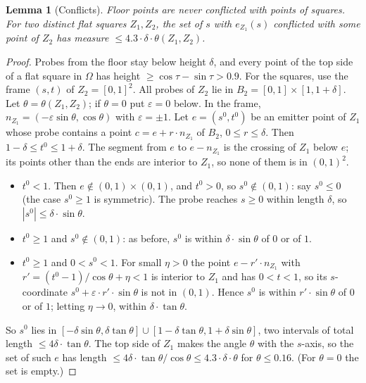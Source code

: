 \documentclass[11pt,letterpaper]{amsart}
\theoremstyle{plain}
\newtheorem{lemma}[theorem]{Lemma}
\theoremstyle{definition}
\theoremstyle{remark}
\begin{document}
\begin{lemma}[Conflicts]\label{lem:conflicts}
Floor points are never conflicted with points of squares. For two distinct flat squares $Z_1,Z_2$, the set of $s$ with $e_{Z_1}(s)$ conflicted with some point of $Z_2$ has measure $\le4.3\cdot\delta\cdot\theta(Z_1,Z_2)$.
\end{lemma}
\begin{proof}
Probes from the floor stay below height $\delta$, and every point of the top side of a flat square in $\Omega$ has height $\ge\cos\tau-\sin\tau>0.9$. For the squares, use the frame $(s,t)$ of $Z_2=[0,1]^2$. All probes of $Z_2$ lie in $B_2=[0,1]\times[1,1+\delta]$. Let $\theta=\theta(Z_1,Z_2)$; if $\theta=0$ put $\varepsilon=0$ below. In the frame, $n_{Z_1}=(-\varepsilon\sin\theta,\cos\theta)$ with $\varepsilon=\pm1$. Let $e=(s^0,t^0)$ be an emitter point of $Z_1$ whose probe contains a point $c=e+r\cdot n_{Z_1}$ of $B_2$, $0\le r\le\delta$. Then $1-\delta\le t^0\le1+\delta$. The segment from $e$ to $e-n_{Z_1}$ is the crossing of $Z_1$ below $e$; its points other than the ends are interior to $Z_1$, so none of them is in $(0,1)^2$.
\begin{itemize}
\item $t^0<1$. Then $e\notin(0,1)\times(0,1)$, and $t^0>0$, so $s^0\notin(0,1)$: say $s^0\le0$ (the case $s^0\ge1$ is symmetric). The probe reaches $s\ge0$ within length $\delta$, so $|s^0|\le\delta\cdot\sin\theta$.
\item $t^0\ge1$ and $s^0\notin(0,1)$: as before, $s^0$ is within $\delta\cdot\sin\theta$ of $0$ or of $1$.
\item $t^0\ge1$ and $0<s^0<1$. For small $\eta>0$ the point $e-r'\cdot n_{Z_1}$ with $r'=(t^0-1)/\cos\theta+\eta<1$ is interior to $Z_1$ and has $0<t<1$, so its $s$-coordinate $s^0+\varepsilon\cdot r'\cdot\sin\theta$ is not in $(0,1)$. Hence $s^0$ is within $r'\cdot\sin\theta$ of $0$ or of $1$; letting $\eta\to0$, within $\delta\cdot\tan\theta$.
\end{itemize}
So $s^0$ lies in $[-\delta\sin\theta,\delta\tan\theta]\cup[1-\delta\tan\theta,1+\delta\sin\theta]$, two intervals of total length $\le4\delta\cdot\tan\theta$. The top side of $Z_1$ makes the angle $\theta$ with the $s$-axis, so the set of such $e$ has length $\le4\delta\cdot\tan\theta/\cos\theta\le4.3\cdot\delta\cdot\theta$ for $\theta\le0.16$. (For $\theta=0$ the set is empty.)
\end{proof}
\end{document}

